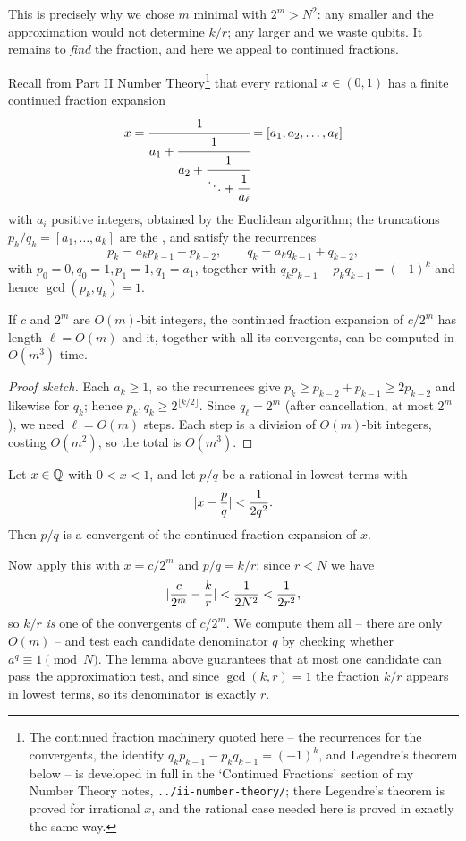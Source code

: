 \documentclass[a4paper]{scrartcl}
\begin{document}
This is precisely why we chose $m$ minimal with $2^m>N^2$: any smaller and the approximation would not determine $k/r$; any larger and we waste qubits. It remains to \emph{find} the fraction, and here we appeal to continued fractions.

Recall from Part II Number Theory\footnote{The continued fraction machinery quoted here -- the recurrences for the convergents, the identity $q_kp_{k-1}-p_kq_{k-1} = (-1)^k$, and Legendre's theorem below -- is developed in full in the `Continued Fractions' section of my Number Theory notes, \texttt{../ii-number-theory/}; there Legendre's theorem is proved for irrational $x$, and the rational case needed here is proved in exactly the same way.} that every rational $x\in(0,1)$ has a finite continued fraction expansion
$$x = \cfrac{1}{a_1+\cfrac{1}{a_2+\cfrac1{\ddots+\cfrac1{a_\ell}}}} = [a_1,a_2,\dots,a_\ell]$$
with $a_i$ positive integers, obtained by the Euclidean algorithm; the truncations $p_k/q_k = [a_1,\dots,a_k]$ are the , and satisfy the recurrences
$$p_k = a_kp_{k-1}+p_{k-2}, \qquad q_k = a_kq_{k-1}+q_{k-2},$$
with $p_0 = 0, q_0 = 1, p_1 = 1, q_1 = a_1$, together with $q_kp_{k-1}-p_kq_{k-1} = (-1)^k$ and hence $\gcd(p_k,q_k)=1$.

\begin{theorem}
	If $c$ and $2^m$ are $O(m)$-bit integers, the continued fraction expansion of $c/2^m$ has length $\ell = O(m)$ and it, together with all its convergents, can be computed in $O(m^3)$ time.
\end{theorem}

\begin{proof}[Proof sketch]
	Each $a_k\geq1$, so the recurrences give $p_k\geq p_{k-2}+p_{k-1}\geq2p_{k-2}$ and likewise for $q_k$; hence $p_k,q_k\geq2^{\lfloor k/2\rfloor}$. Since $q_\ell = 2^m$ (after cancellation, at most $2^m$), we need $\ell = O(m)$ steps. Each step is a division of $O(m)$-bit integers, costing $O(m^2)$, so the total is $O(m^3)$.
\end{proof}

\begin{theorem}[Legendre]
	Let $x\in\mathbb{Q}$ with $0<x<1$, and let $p/q$ be a rational in lowest terms with
	$$\lvert x - \frac pq\rvert<\frac1{2q^2}.$$
	Then $p/q$ is a convergent of the continued fraction expansion of $x$.
\end{theorem}

Now apply this with $x = c/2^m$ and $p/q = k/r$: since $r<N$ we have
$$\lvert\frac c{2^m}-\frac kr\rvert<\frac1{2N^2}<\frac1{2r^2},$$
so $k/r$ \emph{is} one of the convergents of $c/2^m$. We compute them all -- there are only $O(m)$ -- and test each candidate denominator $q$ by checking whether $a^q\equiv1\pmod N$. The lemma above guarantees that at most one candidate can pass the approximation test, and since $\gcd(k,r)=1$ the fraction $k/r$ appears in lowest terms, so its denominator is exactly $r$.
\end{document}
